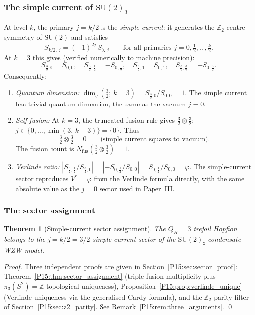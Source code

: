 \documentclass[11pt,a4paper]{article}
\newtheorem{theorem}{Theorem}[section]
\theoremstyle{definition}\newtheorem{definition}[theorem]{Definition}
\theoremstyle{remark}
\newcommand{\vp}{\varphi}
\newcommand{\QH}{Q_H}
\begin{document}
\subsubsection*{The simple current of $\mathrm{SU}(2)_3$}

At level $k$, the primary $j=k/2$ is the \emph{simple current}:
it generates the $\mathbb{Z}_2$ centre symmetry of $\mathrm{SU}(2)$
and satisfies
\begin{equation}
  S_{k/2,\,j} = (-1)^{2j}\,S_{0,\,j}
  \qquad\text{for all primaries } j = 0,\tfrac{1}{2},\ldots,\tfrac{k}{2}.
  \label{P15:eq:simple_current_S}
\end{equation}
At $k=3$ this gives (verified numerically to machine precision):
\begin{equation}
  S_{\frac32,0} = S_{0,0},\quad
  S_{\frac32,\frac12} = -S_{0,\frac12},\quad
  S_{\frac32,1} = S_{0,1},\quad
  S_{\frac32,\frac32} = -S_{0,\frac32}.
  \label{P15:eq:sc_explicit}
\end{equation}
Consequently:
\begin{enumerate}[label=\textup{(\roman*)}]
\item \emph{Quantum dimension:}
  $\dim_q(\tfrac{3}{2};\,k{=}3) = S_{\frac32,0}/S_{0,0} = 1$.
  The simple current has trivial quantum dimension,
  the same as the vacuum $j=0$.
\item \emph{Self-fusion:} At $k=3$, the truncated fusion rule gives
  $\tfrac{3}{2}\otimes\tfrac{3}{2}$:
  $j\in\{0,\ldots,\min(3,\,k-3)\}=\{0\}$.
  Thus
  \begin{equation}
    \tfrac{3}{2}\otimes\tfrac{3}{2} = 0
    \qquad\text{(simple current squares to vacuum)}.
    \label{P15:eq:sc_selffusion}
  \end{equation}
  The fusion count is $N_{\mathrm{fus}}(\tfrac{3}{2}\otimes\tfrac{3}{2})=1$.
\item \emph{Verlinde ratio:}
  $|S_{\frac32,\frac12}/S_{\frac32,0}|
  = |{-}S_{0,\frac12}/S_{0,0}|
  = S_{0,\frac12}/S_{0,0}
  = \vp$.
  The simple-current sector reproduces $V^*=\vp$ from the Verlinde
  formula directly, with the same absolute value as the $j=0$
  sector used in Paper~III.
\end{enumerate}

\subsubsection*{The sector assignment}

\begin{theorem}[Simple-current sector assignment]
\label{P15:conj:sector}
The $\QH=3$ trefoil Hopfion belongs to the $j=k/2=3/2$ simple-current
sector of the $\mathrm{SU}(2)_3$ condensate WZW model.
\end{theorem}
\begin{proof}
Three independent proofs are given in Section~\ref{P15:sec:sector_proof}:
Theorem~\ref{P15:thm:sector_assignment} (triple-fusion multiplicity plus
$\pi_3(S^2)=\mathbb{Z}$ topological uniqueness),
Proposition~\ref{P15:prop:verlinde_unique} (Verlinde uniqueness via the
generalised Cardy formula), and the $\mathbb{Z}_2$ parity filter of
Section~\ref{P15:sec:z2_parity}. See Remark~\ref{P15:rem:three_arguments}.
\qed
\end{proof}
\end{document}
